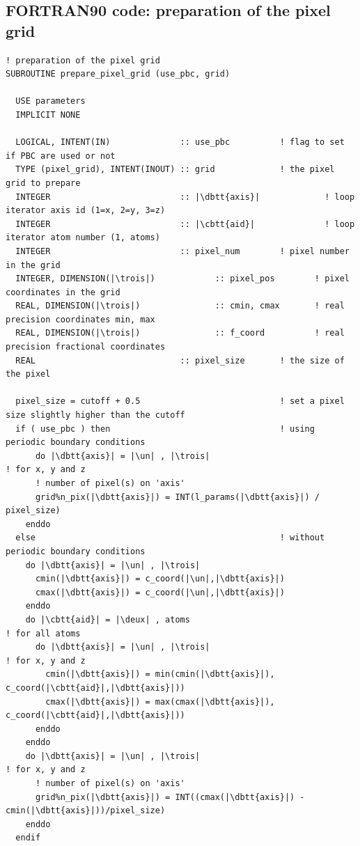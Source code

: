 \clearpage

\subsection{FORTRAN90 code: preparation of the pixel grid}
\label{f-pc-grid}

\begin{lstlisting}[language={[90]FORTRAN}]
! preparation of the pixel grid
SUBROUTINE prepare_pixel_grid (use_pbc, grid)
  
  USE parameters
  IMPLICIT NONE
  
  LOGICAL, INTENT(IN)              :: use_pbc          ! flag to set if PBC are used or not
  TYPE (pixel_grid), INTENT(INOUT) :: grid             ! the pixel grid to prepare
  INTEGER                          :: |\dbtt{axis}|             ! loop iterator axis id (1=x, 2=y, 3=z)
  INTEGER                          :: |\cbtt{aid}|              ! loop iterator atom number (1, atoms)
  INTEGER                          :: pixel_num        ! pixel number in the grid
  INTEGER, DIMENSION(|\trois|)            :: pixel_pos        ! pixel coordinates in the grid
  REAL, DIMENSION(|\trois|)               :: cmin, cmax       ! real precision coordinates min, max
  REAL, DIMENSION(|\trois|)               :: f_coord          ! real precision fractional coordinates
  REAL                             :: pixel_size       ! the size of the pixel

  pixel_size = cutoff + 0.5                            ! set a pixel size slightly higher than the cutoff
  if ( use_pbc ) then                                  ! using periodic boundary conditions
      do |\dbtt{axis}| = |\un| , |\trois|                                  ! for x, y and z
      ! number of pixel(s) on 'axis'
      grid%n_pix(|\dbtt{axis}|) = INT(l_params(|\dbtt{axis}|) / pixel_size)
    enddo
  else                                                 ! without periodic boundary conditions
    do |\dbtt{axis}| = |\un| , |\trois|
      cmin(|\dbtt{axis}|) = c_coord(|\un|,|\dbtt{axis}|)
      cmax(|\dbtt{axis}|) = c_coord(|\un|,|\dbtt{axis}|)
    enddo
    do |\cbtt{aid}| = |\deux| , atoms                                 ! for all atoms
      do |\dbtt{axis}| = |\un| , |\trois|                                  ! for x, y and z
        cmin(|\dbtt{axis}|) = min(cmin(|\dbtt{axis}|), c_coord(|\cbtt{aid}|,|\dbtt{axis}|))
        cmax(|\dbtt{axis}|) = max(cmax(|\dbtt{axis}|), c_coord(|\cbtt{aid}|,|\dbtt{axis}|))
      enddo
    enddo
    do |\dbtt{axis}| = |\un| , |\trois|                                    ! for x, y and z
      ! number of pixel(s) on 'axis'
      grid%n_pix(|\dbtt{axis}|) = INT((cmax(|\dbtt{axis}|) - cmin(|\dbtt{axis}|))/pixel_size)
    enddo
  endif
  

\end{lstlisting}
